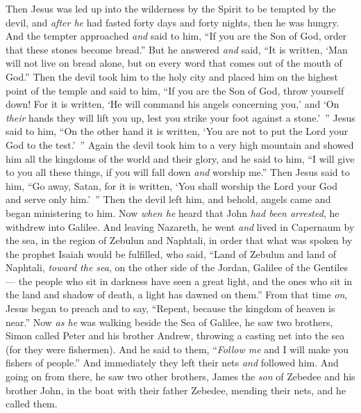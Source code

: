\begin{biblechapter} %
 Then Jesus was led up into the wilderness by the Spirit to be tempted by the devil,
\verse and \textit{after he} had fasted forty days and forty nights, then he was hungry.
\verse And the tempter approached \textit{and} said to him, “If you are the Son of God, order that these stones become bread.”
\verse But he answered \textit{and} said, “It is written, ‘Man will not live on bread alone, but on every word that comes out of the mouth of God.”
\verse Then the devil took him to the holy city and placed him on the highest point of the temple
\verse and said to him, “If you are the Son of God, throw yourself down! For it is written, ‘He will command his angels concerning you,’ and ‘On \textit{their} hands they will lift you up, 
lest you strike your foot against a stone.’ ”
\verse Jesus said to him, “On the other hand it is written, ‘You are not to put the Lord your God to the test.’ ”
\verse Again the devil took him to a very high mountain and showed him all the kingdoms of the world and their glory,
\verse and he said to him, “I will give to you all these things, if you will fall down \textit{and} worship me.”
\verse Then Jesus said to him, “Go away, Satan, for it is written, ‘You shall worship the Lord your God and serve only him.’ ”
\verse Then the devil left him, and behold, angels came and began ministering to him.
 Now \textit{when he} heard that John \textit{had been arrested}, he withdrew into Galilee.
\verse And leaving Nazareth, he went \textit{and} lived in Capernaum by the sea, in the region of Zebulun and Naphtali,
\verse in order that what was spoken by the prophet Isaiah would be fulfilled, who said,
\verse “Land of Zebulun and land of Naphtali, 
\textit{toward the sea}, on the other side of the Jordan, 
Galilee of the Gentiles—
\verse the people who sit in darkness 
have seen a great light, 
and the ones who sit in the land and shadow of death, 
a light has dawned on them.”
\verse From that time \textit{on}, Jesus began to preach and to say, “Repent, because the kingdom of heaven is near.”
 Now \textit{as he} was walking beside the Sea of Galilee, he saw two brothers, Simon called Peter and his brother Andrew, throwing a casting net into the sea (for they were fishermen).
\verse And he said to them, “\textit{Follow me} and I will make you fishers of people.”
\verse And immediately they left their nets \textit{and} followed him.
\verse And going on from there, he saw two other brothers, James the \textit{son} of Zebedee and his brother John, in the boat with their father Zebedee, mending their nets, and he called them.

\end{biblechapter}
